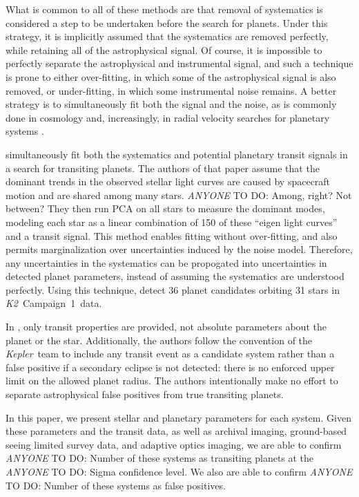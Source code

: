 \documentclass{emulateapj}
\newcommand{\project}[1]{\textsl{#1}}
\newcommand{\kep}{\project{Kepler}}
\newcommand{\KT}{\project{K2}}
\newcommand{\Ci}{Campaign~1}
\newcommand{\paperit}{\citet{Foreman-Mackey15}}
\newcommand{\todo}[3]{{\color{#2} \emph{#1} TO DO: #3}}
\newcommand{\anytodo}[1]{\todo{ANYONE}{NavyBlue}{#1}}
\begin{document}
What is common to all of these methods are that removal of systematics is considered a
step to be undertaken before the search for planets.
Under this strategy, it is implicitly assumed that the systematics are removed perfectly,
while retaining all of the astrophysical signal.
Of course, it is impossible to perfectly separate the astrophysical and instrumental
signal, and such a technique is prone to either over-fitting, in which some of the
astrophysical signal is also removed, or under-fitting, in which some instrumental noise
remains.
A better strategy is to simultaneously fit both the signal and the noise, as is commonly
done in cosmology and, increasingly, in radial velocity searches for planetary systems
\citep[e.g.][]{Ferreira00, Boisse11, Haywood14, Grunblatt15}.

\paperit{} simultaneously fit both the systematics and potential planetary transit signals
in a search for transiting planets.
The authors of that paper assume that the dominant trends in the observed stellar light
curves are caused by spacecraft motion and are shared among many stars. \anytodo{Among,
right? Not between?}
They then run PCA on all stars to measure the dominant modes, modeling each star as a
linear combination of 150 of these ``eigen light curves'' and a transit signal.
This method enables fitting without over-fitting, and also permits marginalization over
uncertainties induced by the noise model.
Therefore, any uncertainties in the systematics can be propogated into uncertainties in
detected planet parameters, instead of assuming the systematics are understood perfectly.
Using this technique, \paperit{} detect 36 planet candidates orbiting 31 stars in \KT\
\Ci\ data.

In \paperit, only transit properties are provided, not absolute parameters about the
planet or the star.
Additionally, the authors follow the convention of the \kep\ team to include any
transit event as a candidate system rather than a false positive if a secondary eclipse
is not detected: there is no enforced upper limit on the allowed planet radius.
The authors intentionally make no effort to separate astrophysical false positives from
true transiting planets.

In this paper, we present stellar and planetary parameters for each system.
Given these parameters and the transit data, as well as archival imaging, ground-based
seeing limited survey data, and adaptive optics imaging, we are able to confirm
\anytodo{Number} of these systems as transiting planets at the \anytodo{Sigma} confidence
level. We also are able to confirm \anytodo{Number} of these systems as false positives.
\end{document}

